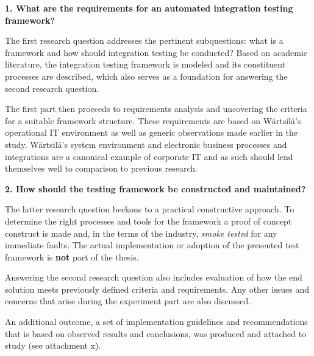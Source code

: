 \documentclass[12pt,a4paper,oneside,pdftex]{report}
\begin{document}
\begin{adjustwidth}{2.5em}{0pt}
\textbf{1. What are the requirements for an automated integration testing framework?} \\
\end{adjustwidth}

The first research question addresses the pertinent subquestions: what is a framework and how should integration testing be conducted? Based on academic literature, the integration testing framework is modeled and its constituent processes are described, which also serves as a foundation for answering the second research question.

The first part then proceeds to requirements analysis and uncovering the criteria for a suitable framework structure. These requirements are based on Wärtsilä's operational IT environment as well as generic observations made earlier in the study. Wärtsilä's system environment and electronic business processes and integrations are a canonical example of corporate IT and as such should lend themselves well to comparison to previous research. \\


\begin{adjustwidth}{2.5em}{0pt}
\textbf{2. How should the testing framework be constructed and maintained?} \\
\end{adjustwidth}

The latter research question beckons to a practical constructive approach. To determine the right processes and tools for the framework a proof of concept construct is made and, in the terms of the industry, \emph{smoke tested} for any immediate faults. The actual implementation or adoption of the presented test framework is \textbf{not} part of the thesis.

Answering the second research question also includes evaluation of how the end solution meets previously defined criteria and requirements. Any other issues and concerns that arise during the experiment part are also discussed.

An additional outcome, a set of implementation guidelines and recommendations that is based on observed results and conclusions, was produced and attached to study (see attachment x). %
\end{document}
